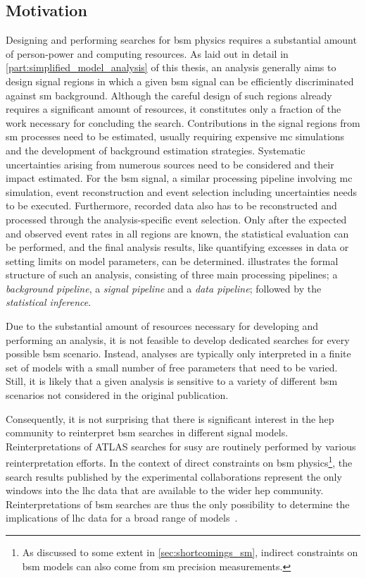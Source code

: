 \subsection{Motivation}
Designing and performing searches for \gls{bsm} physics requires a substantial amount of person-power and computing resources. As laid out in detail in \cref{part:simplified_model_analysis} of this thesis, an analysis generally aims to design signal regions in which a given \gls{bsm} signal can be efficiently discriminated against \gls{sm} background. Although the careful design of such regions already requires a significant amount of resources, it constitutes only a fraction of the work necessary for concluding the search. 
Contributions in the signal regions from \gls{sm} processes need to be estimated, usually requiring expensive \gls{mc} simulations and the development of background estimation strategies. Systematic uncertainties arising from numerous sources need to be considered and their impact estimated. 
For the \gls{bsm} signal, a similar processing pipeline involving \gls{mc} simulation, event reconstruction and event selection including uncertainties needs to be executed.
Furthermore, recorded data also has to be reconstructed and processed through the analysis-specific event selection.
Only after the expected and observed event rates in all regions are known, the statistical evaluation can be performed, and the final analysis results, like quantifying excesses in data or setting limits on model parameters, can be determined.
 illustrates the formal structure of such an analysis, consisting of three main processing pipelines; a \textit{background pipeline}, a \textit{signal pipeline} and a \textit{data pipeline}; followed by the \textit{statistical inference}.

Due to the substantial amount of resources necessary for developing and performing an analysis, it is not feasible to develop dedicated searches for every possible \gls{bsm} scenario.
Instead, analyses are typically only interpreted in a finite set of models with a small number of free parameters that need to be varied.
Still, it is likely that a given analysis is sensitive to a variety of different \gls{bsm} scenarios not considered in the original publication. 

Consequently, it is not surprising that there is significant interest in the \gls{hep} community to reinterpret \gls{bsm} searches in different signal models. Reinterpretations of ATLAS searches for \gls{susy} are routinely performed by various reinterpretation efforts. In the context of direct constraints on \gls{bsm} physics\footnote{As discussed to some extent in \cref{sec:shortcomings_sm}, indirect constraints on \gls{bsm} models can also come from \gls{sm} precision measurements.}, the search results published by the experimental collaborations represent the only windows into the \gls{lhc} data that are available to the wider \gls{hep} community.
Reinterpretations of \gls{bsm} searches are thus the only possibility to determine the implications of \gls{lhc} data for a broad range of models~\cite{reinterpretation_workshop}.

